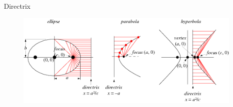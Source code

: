 \documentclass[10pt]{beamer}
\begin{document}
\begin{frame}{Directrix}
  \begin{figure}
    \includegraphics[width=\textwidth]{beamer-pics/directrix.png}
  \end{figure}
\end{frame}
\end{document}
